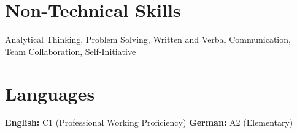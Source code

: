 \documentclass[letterpaper,11pt]{article}
\begin{document}
\section{Non-Technical Skills}
 \begin{itemize}[leftmargin=0.15in, label={}]
    \small{\item{
     Analytical Thinking, Problem Solving, Written and Verbal Communication, Team Collaboration, Self-Initiative
    }}
 \end{itemize}

\section{Languages}
 \begin{itemize}[leftmargin=0.15in, label={}]
    \small{\item{
     \textbf{English:} C1 (Professional Working Proficiency) \quad
     \textbf{German:} A2 (Elementary)
    }}
 \end{itemize}

\end{document}
